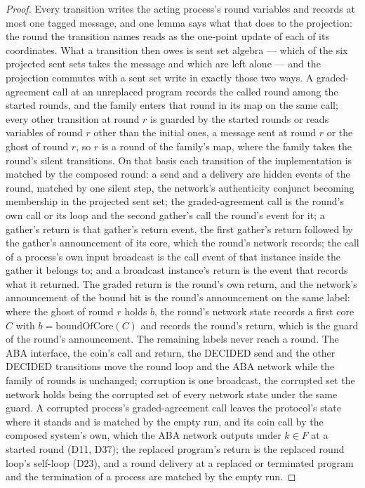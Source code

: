 \begin{proof}\leanok
  Every transition writes the acting process's round variables and records at most one tagged message, and one lemma says what that does to the projection: the round the transition names reads as the one-point update of each of its coordinates.
  What a transition then owes is sent set algebra --- which of the six projected sent sets takes the message and which are left alone --- and the projection commutes with a sent set write in exactly those two ways.
  A graded-agreement call at an unreplaced program records the called round among the started rounds, and the family enters that round in its map on the same call; every other transition at round $r$ is guarded by the started rounds or reads variables of round $r$ other than the initial ones, a message sent at round $r$ or the ghost of round $r$, so $r$ is a round of the family's map, where the family takes the round's silent transitions.
  On that basis each transition of the implementation is matched by the composed round: a send and a delivery are hidden events of the round, matched by one silent step, the network's authenticity conjunct becoming membership in the projected sent set; the graded-agreement call is the round's own call or its loop and the second gather's call the round's event for it; a gather's return is that gather's return event, the first gather's return followed by the gather's announcement of its core, which the round's network records; the call of a process's own input broadcast is the call event of that instance inside the gather it belongs to; and a broadcast instance's return is the event that records what it returned.
  The graded return is the round's own return, and the network's announcement of the bound bit is the round's announcement on the same label: where the ghost of round $r$ holds $b$, the round's network state records a first core $C$ with $b = \mathrm{boundOfCore}(C)$ and records the round's return, which is the guard of the round's announcement.\leanok{}
  The remaining labels never reach a round.
  The ABA interface, the coin's call and return, the DECIDED send and the other DECIDED transitions move the round loop and the ABA network while the family of rounds is unchanged; corruption is one broadcast, the corrupted set the network holds being the corrupted set of every network state under the same guard.
  A corrupted process's graded-agreement call leaves the protocol's state where it stands and is matched by the empty run, and its coin call by the composed system's own, which the ABA network outputs under $k \in F$ at a started round (D11, D37); the replaced program's return is the replaced round loop's self-loop (D23), and a round delivery at a replaced or terminated program and the termination of a process are matched by the empty run.

\end{proof}
